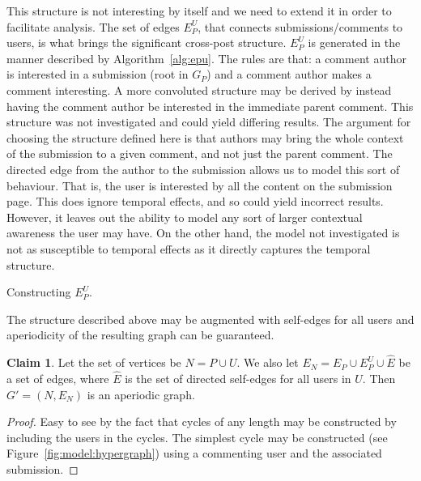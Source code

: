 \documentclass[letterpaper, 10 pt, conference]{ieeeconf}
\theoremstyle{definition}
\newtheorem{claim}{Claim}[section]
\begin{document}
This structure is not interesting by itself and we need to extend it in order to facilitate analysis. The set of edges \(E_P^U\), that connects submissions/comments to users, is what brings the significant cross-post structure. \(E_P^U\) is generated in the manner described by Algorithm~\ref{alg:epu}. The rules are that: a comment author is interested in a submission (root in \(G_P\)) and a comment author makes a comment interesting. A more convoluted structure may be derived by instead having the comment author be interested in the immediate parent comment. This structure was not investigated and could yield differing results. The argument for choosing the structure defined here is that authors may bring the whole context of the submission to a given comment, and not just the parent comment. The directed edge from the author to the submission allows us to model this sort of behaviour. That is, the user is interested by all the content on the submission page. This does ignore temporal effects, and so could yield incorrect results. However, it leaves out the ability to model any sort of larger contextual awareness the user may have. On the other hand, the model not investigated is not as susceptible to temporal effects as it directly captures the temporal structure.
\begin{algorithm}
  \caption{Constructing \(E_P^U.\)}
  \label{alg:epu}
\end{algorithm}
The structure described above may be augmented with self-edges for all users and aperiodicity of the resulting graph can be guaranteed.
\begin{claim}
  Let the set of vertices be \(N = P \cup U.\) We also let \(E_N = E_P \cup E_P^U \cup \hat{E}\) be a set of edges, where \(\hat{E}\) is the set of directed self-edges for all users in \(U.\) Then \(G' = (N, E_N)\) is an aperiodic graph.
  \label{claim:g1:aperiodic}
\end{claim}
\begin{proof}
  Easy to see by the fact that cycles of any length may be constructed by including the users in the cycles. The simplest cycle may be constructed (see Figure~\ref{fig:model:hypergraph}) using a commenting user and the associated submission.
\end{proof}
\end{document}
